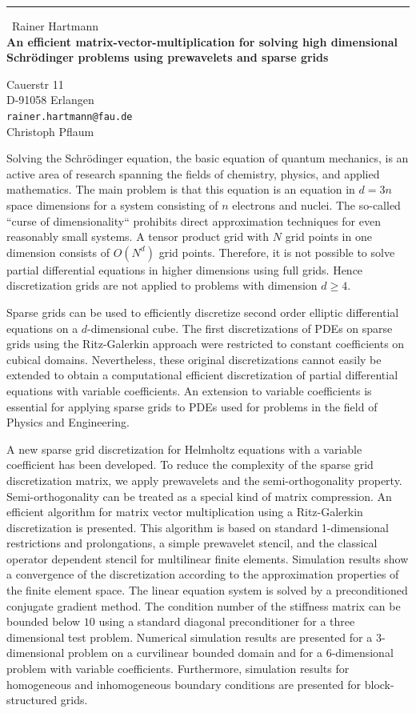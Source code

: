 \documentclass{report}
\begin{document}
\begin{center}
\rule{6in}{1pt} \
{\large Rainer Hartmann \\
{\bf An efficient matrix-vector-multiplication for solving high dimensional Schr\"odinger problems using prewavelets and sparse grids}}

Cauerstr 11 \\ D-91058 Erlangen
\\
{\tt rainer.hartmann@fau.de}\\
Christoph Pflaum\end{center}

Solving the Schr\"odinger equation, the basic equation of quantum
mechanics, is an active area of research spanning the fields of
chemistry, physics, and applied mathematics.
The main problem is that this equation is an equation in $ d = 3n$ space
dimensions for a system consisting of $n$ electrons and nuclei.
The so-called ``curse of dimensionality`` prohibits direct approximation
techniques for even reasonably small systems.
A tensor product grid with $ N $ grid points in one dimension consists of
$O \left(N^d\right)$ grid points.
Therefore, it is not possible to solve partial differential equations in
higher dimensions using full grids.
Hence discretization grids are not applied to problems with dimension $d \geq 4$.

Sparse grids can be used to efficiently discretize second order elliptic
differential equations on a $d$-dimensional cube.
The first discretizations of PDEs on sparse grids using the Ritz-Galerkin
approach were restricted to constant coefficients on cubical domains.
Nevertheless, these original discretizations cannot easily be extended to
obtain a computational efficient discretization of partial differential
equations with variable coefficients.
An extension to variable coefficients is essential for applying sparse
grids to PDEs used for problems in the field of Physics and Engineering.

A new sparse grid discretization for Helmholtz equations with a variable
coefficient has been developed.
To reduce the complexity of the sparse grid discretization matrix, we
apply prewavelets and the semi-orthogonality property.
Semi-orthogonality can be treated as a special kind of matrix compression.
An efficient algorithm for matrix vector multiplication using a
Ritz-Galerkin discretization is presented.
This algorithm is based on standard 1-dimensional restrictions and
prolongations, a simple prewavelet stencil, and the classical operator
dependent stencil for multilinear finite elements.
Simulation results show a convergence of the discretization according to
the approximation properties of the finite element space.
The linear equation system is solved by a preconditioned conjugate gradient method.
The condition number of the stiffness matrix can be bounded below $10$
using a standard diagonal preconditioner for a three dimensional test
problem.
Numerical simulation results are presented for a 3-dimensional problem on
a curvilinear bounded domain and for a 6-dimensional problem with
variable coefficients.
Furthermore, simulation results for homogeneous and inhomogeneous
boundary conditions are presented for block-structured grids.
\end{document}
